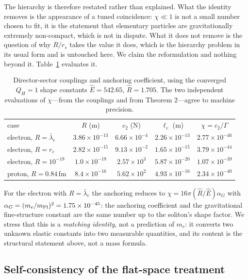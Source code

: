 \documentclass[aps,prd,preprint,nofootinbib,longbibliography]{revtex4-2}
\newcommand{\Qh}{Q_H}
\newcommand{\lc}{\ell_c}
\newcommand{\Ehat}{\hat{E}}
\newcommand{\Rhat}{\hat{R}}
\begin{document}
The hierarchy is therefore restated rather than explained. What the identity
removes is the appearance of a tuned coincidence: $\chi\ll1$ is not a small
number chosen to fit, it is the statement that elementary particles are
gravitationally extremely non-compact, which is not in dispute. What it does not
remove is the question of why $R/r_s$ takes the value it does, which is the
hierarchy problem in its usual form and is untouched here. We claim the
reformulation and nothing beyond it. Table~\ref{tab:anchoring} evaluates it.

\begin{table}[t]
\caption{Director-sector couplings and anchoring coefficient, using the converged
$\Qh=1$ shape constants $\Ehat=542.65$, $\Rhat=1.705$. The two independent
evaluations of $\chi$---from the couplings and from Theorem 2---agree to machine
precision.}
\label{tab:anchoring}
\begin{ruledtabular}
\begin{tabular}{lcccc}
case & $R$ (m) & $c_2$ (N) & $\lc$ (m) & $\chi=c_2/\Gamma$ \\
\colrule
electron, $R=\bar\lambda_e$ & $3.86\times10^{-13}$ & $6.66\times10^{-4}$ & $2.26\times10^{-13}$ & $2.77\times10^{-46}$ \\
electron, $R=r_e$           & $2.82\times10^{-15}$ & $9.13\times10^{-2}$ & $1.65\times10^{-15}$ & $3.79\times10^{-44}$ \\
electron, $R=10^{-19}$      & $1.0\times10^{-19}$  & $2.57\times10^{3}$  & $5.87\times10^{-20}$ & $1.07\times10^{-39}$ \\
proton, $R=0.84\,$fm        & $8.4\times10^{-16}$  & $5.62\times10^{2}$  & $4.93\times10^{-16}$ & $2.34\times10^{-40}$ \\
\end{tabular}
\end{ruledtabular}
\end{table}

For the electron with $R=\bar\lambda_e$ the anchoring reduces to
$\chi=16\pi(\Rhat/\Ehat)\alpha_G$ with $\alpha_G=(m_e/m_{\rm
Pl})^2=1.75\times10^{-45}$: the anchoring coefficient and the gravitational
fine-structure constant are the same number up to the soliton's shape factor. We
stress that this is a \emph{matching identity}, not a prediction of $m_e$: it
converts two unknown elastic constants into two measurable quantities, and its
content is the structural statement above, not a mass formula.

\subsection{Self-consistency of the flat-space treatment}
\end{document}
